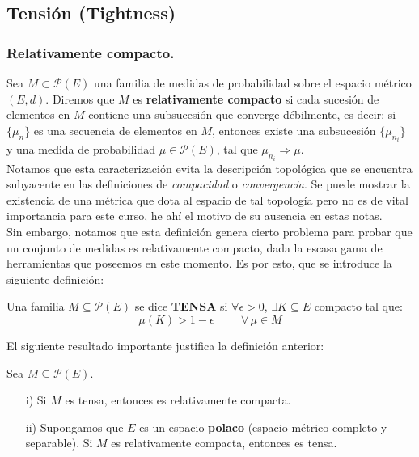 \subsection{Tensión (Tightness)}
\subsubsection{Relativamente compacto.}
\hspace{3.5mm}Sea $M\subset \mathcal{P}(E)$ una familia de medidas de probabilidad sobre el espacio métrico $(E,d)$. Diremos que $M$ es \textbf{relativamente compacto} si cada sucesión de elementos en $M$ contiene una subsucesión que converge débilmente, es decir; si $\{\mu_n\}$ es una secuencia de elementos en $M$, entonces existe una subsucesión $\{\mu_{n_i}\}$ y una medida de probabilidad $\mu \in \mathcal{P}(E)$, tal que $\mu_{n_i} \Rightarrow \mu$.  \\ 

Notamos que esta caracterización evita la descripción topológica que se encuentra subyacente en las definiciones de \textit{compacidad} o \textit{convergencia}. Se puede mostrar la existencia de una métrica que dota al espacio de tal topología pero no es de vital importancia para este curso, he ahí el motivo de su ausencia en estas notas. \\

Sin embargo, notamos que esta definición genera cierto problema para probar que un conjunto de medidas es relativamente compacto, dada la escasa gama de herramientas que poseemos en este momento. Es por esto, que se introduce la siguiente definición:

\begin{definicion}[Tensión] Una familia $M\subseteq \mathcal{P}(E)$ se dice \textbf{TENSA} si $\forall \epsilon > 0$, $\exists K\subseteq E$ compacto tal que:
\[\mu(K) > 1-\epsilon \hspace{1cm}\forall\,\mu\in M\]
\end{definicion}

El siguiente resultado importante justifica la definición anterior:


\begin{teorema}[de Prohorov] Sea $M\subseteq \mathcal{P}(E)$.
\begin{itemize}
    \item[i)] Si $M$ es tensa, entonces es relativamente compacta.
    \item[ii)] Supongamos que $E$ es un espacio \textbf{polaco} (espacio métrico completo y separable). Si $M$ es relativamente compacta, entonces es tensa.
\end{itemize}
\end{teorema}

